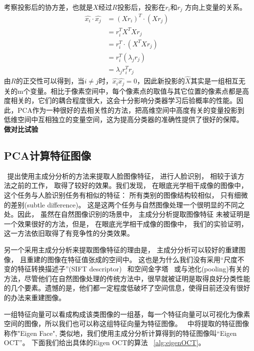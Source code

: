     考察投影后的协方差，也就是$X$经过$R$投影后，投影在$r_i$和$r_j$ 方向上变量的关系。
    \begin{equation}
    \begin{split}
        \hat{x_i} \cdot \hat{x_j} & = (Xr_i)^T \cdot (Xr_j) \\
        & = r_i^T X^T X r_j \\
        & = r_i^T\cdot(X^T X r_j) \\
        & = r_i^T(\lambda_j r_j) \\
        & = \lambda_j r_i^T r_j 
    \end{split}
    \end{equation}
    由$R$的正交性可以得到，当$i \ne j$时，$\hat{x_i} \hat{x_j} = 0$，因此新投影的$\hat{X}$其实是一组相互无关的m个变量。相比于像素空间中，每个像素点的取值与其它位置的像素点都是高度相关的，它们的耦合程度很大，这会十分影响分类器学习后验概率的性能。因此，PCA作为一种很好的去相关性的方法，把高维空间中高度有关的变量投影到低维空间中互相独立的变量空间，这为提高分类器的准确性提供了很好的保障。 \textbf{做对比试验}
 
    
    \subsection{PCA计算特征图像}
        ~提出使用主成分分析的方法来提取人脸图像特征， 进行人脸识别， 相较于该方法之前的工作， 取得了较好的效果。我们发现， 在眼底光学相干成像的图像中， 这个任务与人脸识别任务有相似的特征： 所有类别的图像结构较相似， 只有细微的差别(subtle difference)。 这是这两个任务与自然图像处理一个很明显的不同之处。因此， 虽然在自然图像识别的场景中， 主成分分析提取图像特征 未被证明是一个效果很好的方法，但是， 在眼底光学相干成像的图像中， 我们的实验证明， 这一方法依旧取得了有竞争性的分类效果。 

        另一个采用主成分分析来提取图像特征的理由是， 主成分分析可以较好的重建图像， 且重建的图像在特征值张成的空间中。  这也是为什么我们没有采用“尺度不变的特征转换描述子”(SIFT descriptor) ~\cite{yang2009linear}和空间金字塔~\cite{lazebnik2006beyond} 或与池化(pooling)有关的方法，尽管他们在自然图像处理的传统方法中，很早就被证明是取得良好分类性能的几个要素。遗憾的是，他们都一定程度低破坏了空间信息，使得目前还没有很好的办法来重建图像。

        一组特征向量可以看成构成该类图像的一组基，每一个特征向量可以可视化为像素空间的图像，所以我们也可以称这组特征向量为特征图像。~\cite{turk1991eigenfaces} 中将提取的特征图像称作"Eigen Face", 类似地，我们使用主成分分析计算得到的特征图像叫“Eigen OCT”。 下面我们给出具体的Eigen OCT的算法 ~\ref{alg:eigenOCT}。

